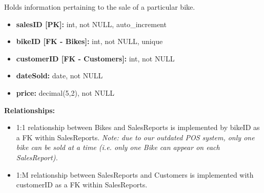 \documentclass{article}
\begin{document}
\begin{tcolorbox}[colback=secondarycolor, colframe=primarycolor, title=\textbf{SalesReports Table}]
Holds information pertaining to the sale of a particular bike.
\vspace{0.2cm}

\begin{itemize}
  \item \textbf{salesID [PK]:} int, not NULL, auto\_increment
  \item \textbf{bikeID [FK - Bikes]:} int, not NULL, unique
  \item \textbf{customerID [FK - Customers]:} int, not NULL
  \item \textbf{dateSold:} date, not NULL
  \item \textbf{price:} decimal(5,2), not NULL
\end{itemize}
\vspace{0.2cm}

\textbf{Relationships:}
\vspace{0.2cm}
\begin{itemize}
  \item 1:1 relationship between Bikes and SalesReports is implemented by bikeID as a FK within SalesReports. \textit{Note: due to our outdated POS system, only one bike can be sold at a time (i.e. only one Bike can appear on each SalesReport).}
  \item 1:M relationship between SalesReports and Customers is implemented with customerID as a FK within SalesReports.
\end{itemize}
\end{tcolorbox}

\vspace{0.5cm}
\end{document}
